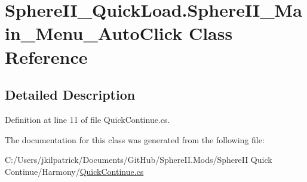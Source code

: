 \hypertarget{class_sphere_i_i___quick_load_1_1_sphere_i_i___main___menu___auto_click}{}\section{Sphere\+I\+I\+\_\+\+Quick\+Load.\+Sphere\+I\+I\+\_\+\+Main\+\_\+\+Menu\+\_\+\+Auto\+Click Class Reference}
\label{class_sphere_i_i___quick_load_1_1_sphere_i_i___main___menu___auto_click}


\subsection{Detailed Description}


Definition at line 11 of file Quick\+Continue.\+cs.



The documentation for this class was generated from the following file\+:\begin{DoxyCompactItemize}
\item 
C\+:/\+Users/jkilpatrick/\+Documents/\+Git\+Hub/\+Sphere\+I\+I.\+Mods/\+Sphere\+I\+I Quick Continue/\+Harmony/\mbox{\hyperlink{_sphere_i_i_01_quick_01_continue_2_harmony_2_quick_continue_8cs}{Quick\+Continue.\+cs}}\end{DoxyCompactItemize}
